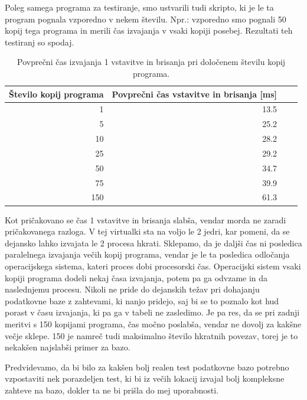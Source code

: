 Poleg samega programa za testiranje, smo ustvarili tudi skripto, ki je le ta program pognala vzporedno v nekem številu. Npr.: vzporedno smo pognali 50 kopij tega programa in merili čas izvajanja v vsaki kopiji posebej. Rezultati teh testiranj so spodaj.

\begin{table}[H]
	\centering
	\begin{tabular}{ | r | r | r | r | }
		\hline
		Število kopij programa & Povprečni čas vstavitve in brisanja [ms]  \\
		\hline
		1 & 13.5 \\
		5 & 25.2 \\
		10 & 28.2 \\
		25 & 29.2 \\
		50 & 34.7 \\
		75 & 39.9 \\
		150 & 61.3 \\
		\hline
	\end{tabular}
	\caption{Povprečni čas izvajanja 1 vstavitve in brisanja pri določenem številu kopij programa.}
	\label{table:1_chunks}
\end{table}

Kot pričakovano se čas 1 vstavitve in brisanja slabša, vendar morda ne zaradi pričakovanega razloga. V tej virtualki sta na voljo le 2 jedri, kar pomeni, da se dejansko lahko izvajata le 2 procesa hkrati. Sklepamo, da je daljši čas ni posledica paralelnega izvajanja večih kopij programa, vendar je le ta posledica odločanja operacijskega sistema, kateri proces dobi procesorski čas. Operacijski sistem vsaki kopiji programa dodeli nekaj časa izvajanja, potem pa ga odvzame in da naslednjemu procesu. Nikoli ne pride do dejanskih težav pri dohajanju podatkovne baze z zahtevami, ki nanjo pridejo, saj bi se to poznalo kot hud porast v času izvajanja, ki pa ga v tabeli ne zasledimo. Je pa res, da se pri zadnji meritvi s 150 kopijami programa, čas močno poslabša, vendar ne dovolj za kakšne večje sklepe. 150 je namreč tudi maksimalno število hkratnih povezav, torej je to nekakšen najslabši primer za bazo.

Predvidevamo, da bi bilo za kakšen bolj realen test podatkovne bazo potrebno vzpostaviti nek porazdeljen test, ki bi iz večih lokacij izvajal bolj kompleksne zahteve na bazo, dokler ta ne bi prišla do mej uporabnosti.

